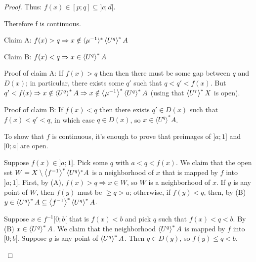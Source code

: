 \begin{proof}
Thus: $f(x)\in[p;q]\subseteq]c;d[$.

Therefore f is continuous.

\begin{grayed}
Claim A: $f (x) > q \Rightarrow x \notin \langle \mu^{- 1}
\rangle^{\ast} \left\langle U^q\right\rangle ^{\ast} A$

Claim B: $f (x) < q \Rightarrow x \in \left\langle U^q\right\rangle ^{\ast} A$

Proof of claim A: If $f (x) > q$ then then there must be some gap between $q$
and $D (x)$; in particular, there exists some $q'$ such that $q < q' < f (x)$.
But $q' < f (x) \Rightarrow x \notin \left\langle U^q\right\rangle ^{\ast} A \Rightarrow x
\notin \left\langle \mu^{- 1}\right\rangle ^{\ast} \left\langle U^q\right\rangle ^{\ast} A$ (using that $\left\langle U^r\right\rangle ^{\ast}X$ is open).

Proof of claim B: If $f (x) < q$ then there exists $q' \in D (x)$ such that $f
(x) < q' < q$, in which case $q \in D (x)$, so $x \in \langle U^q
\rangle^{\ast} A$.

To show that $f$ is continuous, it's enough to prove that preimages of $] a ;
1]$ and $[0 ; a [$ are open.


Suppose $f (x) \in] a ; 1]$. Pick some $q$ with $a < q < f (x)$. We claim that
the open set $W = X \setminus \left\langle f^{- 1}\right\rangle ^{\ast} \langle U^q
\rangle^{\ast} A$ is a neighborhood of $x$ that is mapped by $f$ into $] a ;
1]$. First, by (A), $f (x) > q \Rightarrow x \in W$, so $W$ is a neighborhood
of $x$. If $y$ is any point of $W$, then $f (y)$ must be $\geq q > a$;
otherwise, if $f (y) < q$, then, by (B) $y \in \left\langle U^q\right\rangle ^{\ast} A
\subseteq \left\langle f^{- 1}\right\rangle ^{\ast} \left\langle U^q\right\rangle ^{\ast} A$.

Suppose $x \in f^{- 1} [0 ; b [$ that is $f (x) < b$ and pick $q$ such that $f
(x) < q < b$. By (B) $x \in \left\langle U^q\right\rangle ^{\ast} A$. We claim that the
neighborhood $\left\langle U^q\right\rangle ^{\ast} A$ is mapped by $f$ into $[0 ; b [$.
Suppose $y$ is any point of $\left\langle U^q\right\rangle ^{\ast} A$. Then $q \in D
(y)$, so $f (y) \leq q < b$.

\end{grayed}
\end{proof}